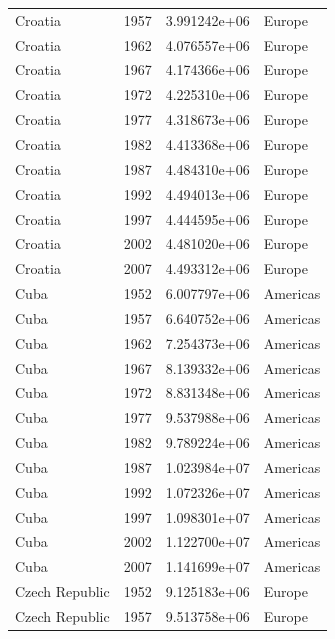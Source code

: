 \documentclass[
  letterpaper,
  DIV=11,
  numbers=noendperiod]{scrreprt}
\begin{document}
\begin{tcolorbox}
\begin{tabular}{lrrl}
Croatia                  &  1957 &  3.991242e+06 &    Europe \\
Croatia                  &  1962 &  4.076557e+06 &    Europe \\
Croatia                  &  1967 &  4.174366e+06 &    Europe \\
Croatia                  &  1972 &  4.225310e+06 &    Europe \\
Croatia                  &  1977 &  4.318673e+06 &    Europe \\
Croatia                  &  1982 &  4.413368e+06 &    Europe \\
Croatia                  &  1987 &  4.484310e+06 &    Europe \\
Croatia                  &  1992 &  4.494013e+06 &    Europe \\
Croatia                  &  1997 &  4.444595e+06 &    Europe \\
Croatia                  &  2002 &  4.481020e+06 &    Europe \\
Croatia                  &  2007 &  4.493312e+06 &    Europe \\
Cuba                     &  1952 &  6.007797e+06 &  Americas \\
Cuba                     &  1957 &  6.640752e+06 &  Americas \\
Cuba                     &  1962 &  7.254373e+06 &  Americas \\
Cuba                     &  1967 &  8.139332e+06 &  Americas \\
Cuba                     &  1972 &  8.831348e+06 &  Americas \\
Cuba                     &  1977 &  9.537988e+06 &  Americas \\
Cuba                     &  1982 &  9.789224e+06 &  Americas \\
Cuba                     &  1987 &  1.023984e+07 &  Americas \\
Cuba                     &  1992 &  1.072326e+07 &  Americas \\
Cuba                     &  1997 &  1.098301e+07 &  Americas \\
Cuba                     &  2002 &  1.122700e+07 &  Americas \\
Cuba                     &  2007 &  1.141699e+07 &  Americas \\
Czech Republic           &  1952 &  9.125183e+06 &    Europe \\
Czech Republic           &  1957 &  9.513758e+06 &    Europe \\

\end{tabular}
\end{tcolorbox}
\end{document}

